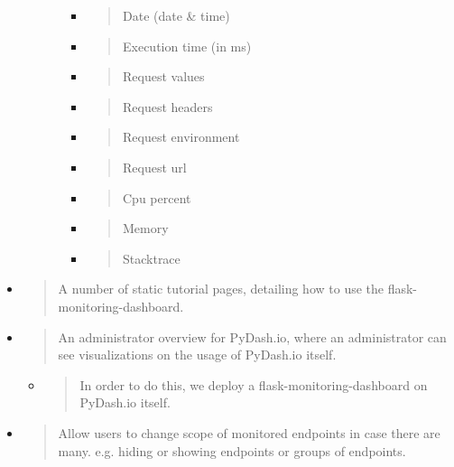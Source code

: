 \begin{itemize}
\begin{itemize}
\begin{itemize}
      \begin{itemize}
      \item
        \begin{quote}
        Date (date \& time)
        \end{quote}
      \item
        \begin{quote}
        Execution time (in ms)
        \end{quote}
      \item
        \begin{quote}
        Request values
        \end{quote}
      \item
        \begin{quote}
        Request headers
        \end{quote}
      \item
        \begin{quote}
        Request environment
        \end{quote}
      \item
        \begin{quote}
        Request url
        \end{quote}
      \item
        \begin{quote}
        Cpu percent
        \end{quote}
      \item
        \begin{quote}
        Memory
        \end{quote}
      \item
        \begin{quote}
        Stacktrace
        \end{quote}
      \end{itemize}
    \end{itemize}
  \end{itemize}
\item
  \begin{quote}
  A number of static tutorial pages, detailing how to use the
  flask-monitoring-dashboard.
  \end{quote}
\item
  \begin{quote}
  An administrator overview for PyDash.io, where an administrator can
  see visualizations on the usage of PyDash.io itself.
  \end{quote}

  \begin{itemize}
  \item
    \begin{quote}
    In order to do this, we deploy a flask-monitoring-dashboard on
    PyDash.io itself.
    \end{quote}
  \end{itemize}
\item
  \begin{quote}
  Allow users to change scope of monitored endpoints in case there are
  many. e.g. hiding or showing endpoints or groups of endpoints.
  \end{quote}
\end{itemize}

